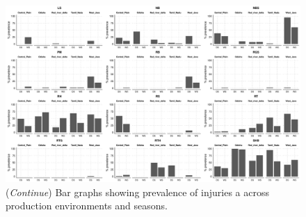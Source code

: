  \begin{landscape}
\begin{figure}
\centering
\includegraphics[height = 1\textwidth]{figures/barplot2.pdf}
\caption[\textit{Continue}]{(\textit{Continue}) Bar graphs showing  prevalence of injuries a across production environments and seasons.}
\label{fig:barplot2}
\end{figure}\end{landscape} 

